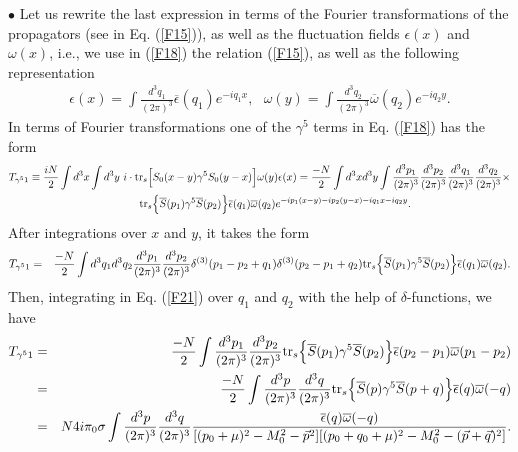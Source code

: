 \documentclass[12pt,a4paper]{article}
\begin{document}
$\bullet$ Let us rewrite the last expression in terms of the Fourier transformations of the propagators (see in Eq. (\ref{F15})), as well as the fluctuation fields $\epsilon (x)$ and $\omega(x)$, i.e., we use in (\ref{F18}) the relation (\ref{F15}), as well as the following representation
\begin{eqnarray}
\epsilon (x)=\int\frac{d^3q_1}{(2\pi)^3}\overline\epsilon (q_1)e^{-iq_1x},~~~
\omega (y)=\int\frac{d^3q_2}{(2\pi)^3}\overline\omega (q_2)e^{-iq_2y}.
\label{F19}
\end{eqnarray}
In terms of Fourier transformations one of the $\gamma^5$ terms in Eq. (\ref{F18}) has the form
\begin{eqnarray}
T_{\gamma^51}\equiv\frac{iN}{2}\int d^3x\int d^3y~
i\cdot {\rm tr}_s\Big[S_0(x-y)\gamma^5S_0(y-x)\Big]\omega(y)\epsilon(x)=\frac{-N}{2}\int d^3x d^3y\int\frac{d^3p_1}{(2\pi)^3}\frac{d^3p_2}{(2\pi)^3}\frac{d^3q_1}{(2\pi)^3}\frac{d^3q_2}{(2\pi)^3}\times\nonumber\\{\rm tr}_s\Big\{\overline S(p_1)\gamma^5\overline
S(p_2)\Big\}\overline \epsilon (q_1)\overline \omega (q_2)e^{-ip_1(x-y)-ip_2(y-x)-iq_1x-iq_2y}.~~~~~~~~~~~~~~~~~~~~~~~~~~~~
\label{F20}
\end{eqnarray}
After integrations over $x$ and $y$, it takes the form
\begin{eqnarray}
T_{\gamma^51}&=&\frac{-N}{2}\int d^3q_1d^3q_2\frac{d^3p_1}{(2\pi)^3}\frac{d^3p_2}{(2\pi)^3}\delta^{(3)}(p_1-p_2+q_1)\delta^{(3)}(p_2-p_1+q_2)%
{\rm tr}_s\Big\{\overline S(p_1)\gamma^5\overline
S(p_2)\Big\}\overline \epsilon (q_1)\overline \omega (q_2).
\label{F21}
\end{eqnarray}
Then, integrating in Eq. (\ref{F21}) over $q_1$ and $q_2$ with the help of $\delta$-functions, we have
\begin{eqnarray}
T_{\gamma^51}&=&\frac{-N}{2}\int \frac{d^3p_1}{(2\pi)^3}\frac{d^3p_2}{(2\pi)^3}{\rm tr}_s\Big\{\overline S(p_1)\gamma^5\overline
S(p_2)\Big\}\overline \epsilon (p_2-p_1)\overline \omega (p_1-p_2)\nonumber\\&=&\frac{-N}{2}\int \frac{d^3p}{(2\pi)^3}\frac{d^3q}{(2\pi)^3}{\rm tr}_s\Big\{\overline S(p)\gamma^5\overline
S(p+q)\Big\}\overline \epsilon (q)\overline \omega (-q)\nonumber\\&=&N4i\pi_0\sigma\int \frac{d^3p}{(2\pi)^3}\frac{d^3q}{(2\pi)^3}\frac{\overline \epsilon (q)\overline \omega (-q)}{[(p_0+\mu)^2-M_0^2-\vec p^2][(p_0+q_0+\mu)^2-M_0^2-(\vec p+\vec q)^2]}.
\label{F22}
\end{eqnarray}
\end{document}
